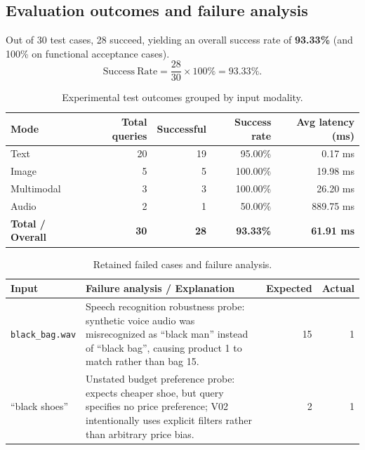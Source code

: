 \documentclass[12pt,a4paper]{article}
\newcommand{\code}[1]{\texttt{#1}}
\begin{document}
\subsection{Evaluation outcomes and failure analysis}
Out of 30 test cases, 28 succeed, yielding an overall success rate of \textbf{93.33\%} (and 100\% on functional acceptance cases).
\begin{equation}
\mathrm{Success\ Rate} = \frac{28}{30} \times 100\% = 93.33\%.
\end{equation}


\begin{table}[H]\centering\small
\caption{Experimental test outcomes grouped by input modality.}\label{tab:mode-results}
\begin{tabular}{@{}lrrrr@{}}\toprule
\textbf{Mode} & \textbf{Total queries} & \textbf{Successful} & \textbf{Success rate} & \textbf{Avg latency (ms)} \\\midrule
Text & 20 & 19 & 95.00\% & 0.17 ms \\
Image & 5 & 5 & 100.00\% & 19.98 ms \\
Multimodal & 3 & 3 & 100.00\% & 26.20 ms \\
Audio & 2 & 1 & 50.00\% & 889.75 ms \\\midrule
\textbf{Total / Overall} & \textbf{30} & \textbf{28} & \textbf{93.33\%} & \textbf{61.91 ms} \\
\bottomrule\end{tabular}\end{table}


\begin{table}[H]\centering\small
\caption{Retained failed cases and failure analysis.}\label{tab:failures}
\begin{tabularx}{\textwidth}{@{}LLrr@{}}\toprule
\textbf{Input} & \textbf{Failure analysis / Explanation} & \textbf{Expected} & \textbf{Actual} \\\midrule
\code{black\_bag.wav} & Speech recognition robustness probe: synthetic voice audio was misrecognized as ``black man'' instead of ``black bag'', causing product 1 to match rather than bag 15. & 15 & 1 \\
``black shoes'' & Unstated budget preference probe: expects cheaper shoe, but query specifies no price preference; V02 intentionally uses explicit filters rather than arbitrary price bias. & 2 & 1 \\
\bottomrule\end{tabularx}\end{table}
\end{document}
